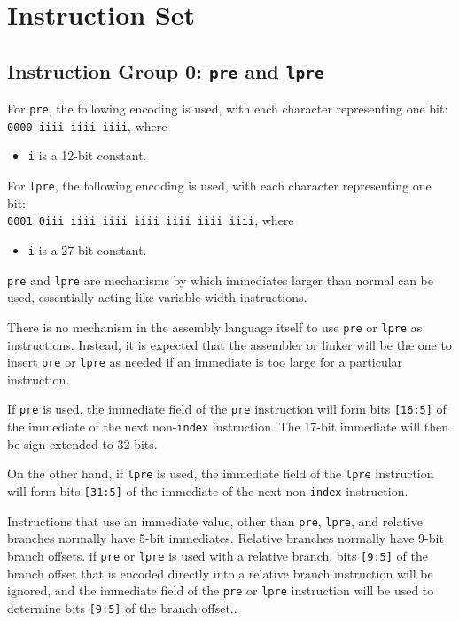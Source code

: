 \documentclass{article}
\begin{document}
	\newpage
	\section{Instruction Set}

	\subsection{Instruction Group 0:  \texttt{pre} and \texttt{lpre}}
	For \texttt{pre}, the following encoding is used, with each character
	representing one bit:  \\
	\texttt{0000 iiii iiii iiii}, where 
	
	\singlespacing
	\begin{itemize}
		\item \texttt{i} is a 12-bit constant.
	\end{itemize}

	For \texttt{lpre}, the following encoding is used, with each character
	representing one bit:  \\
	\texttt{0001 0iii iiii iiii  iiii iiii iiii iiii}, where

	\singlespacing
	\begin{itemize}
		\item \texttt{i} is a 27-bit constant.
	\end{itemize}

	\texttt{pre} and \texttt{lpre} are mechanisms by which immediates
	larger than normal can be used, essentially acting like variable width
	instructions.

	There is no mechanism in the assembly language itself to use
	\texttt{pre} or \texttt{lpre} as instructions.  Instead, it is expected
	that the assembler or linker will be the one to insert \texttt{pre} or
	\texttt{lpre} as needed if an immediate is too large for a particular
	instruction.  

	
	If \texttt{pre} is used, the immediate field of the
	\texttt{pre} instruction will form bits \texttt{[16:5]} of the
	immediate of the next non-\texttt{index} instruction.  The 17-bit
	immediate will then be sign-extended to 32 bits.

	On the other hand, if \texttt{lpre} is used, the immediate field of the
	\texttt{lpre} instruction will form bits \texttt{[31:5]} of the
	immediate of the next non-\texttt{index} instruction.

	Instructions that use an immediate value, other than \texttt{pre},
	\texttt{lpre}, and relative branches normally have 5-bit immediates.
	Relative branches normally have 9-bit branch offsets.  if \texttt{pre}
	or \texttt{lpre} is used with a relative branch, bits \texttt{[9:5]} of
	the branch offset that is encoded directly into a relative branch
	instruction will be ignored, and the immediate field of the
	\texttt{pre} or \texttt{lpre} instruction will be used to determine
	bits \texttt{[9:5]} of the branch offset..
\end{document}
